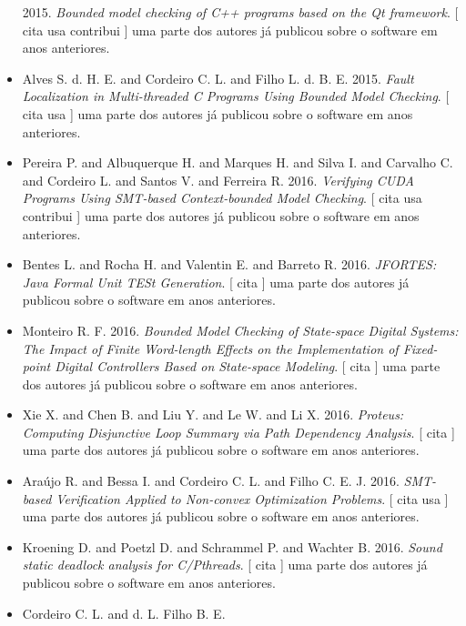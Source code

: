 \begin{itemize}
      2015.
        \textit{ Bounded model checking of C++ programs based on the Qt framework}.
      [
          cita
          usa
          contribui
      ]
uma parte dos autores já publicou sobre o software em anos anteriores.
\item Alves S. d. H. E. and Cordeiro C. L. and Filho L. d. B. E.
      2015.
        \textit{ Fault Localization in Multi-threaded C Programs Using Bounded Model Checking}.
      [
          cita
          usa
      ]
uma parte dos autores já publicou sobre o software em anos anteriores.
\item Pereira P. and Albuquerque H. and Marques H. and Silva I. and Carvalho C. and Cordeiro L. and Santos V. and Ferreira R.
      2016.
        \textit{ Verifying CUDA Programs Using SMT-based Context-bounded Model Checking}.
      [
          cita
          usa
          contribui
      ]
uma parte dos autores já publicou sobre o software em anos anteriores.
\item Bentes L. and Rocha H. and Valentin E. and Barreto R.
      2016.
        \textit{ JFORTES: Java Formal Unit TESt Generation}.
      [
          cita
      ]
uma parte dos autores já publicou sobre o software em anos anteriores.
\item Monteiro R. F.
      2016.
        \textit{ Bounded Model Checking of State-space Digital Systems: The Impact of Finite Word-length Effects on the Implementation of Fixed-point Digital Controllers Based on State-space Modeling}.
      [
          cita
      ]
uma parte dos autores já publicou sobre o software em anos anteriores.
\item Xie X. and Chen B. and Liu Y. and Le W. and Li X.
      2016.
        \textit{ Proteus: Computing Disjunctive Loop Summary via Path Dependency Analysis}.
      [
          cita
      ]
uma parte dos autores já publicou sobre o software em anos anteriores.
\item Araújo R. and Bessa I. and Cordeiro C. L. and Filho C. E. J.
      2016.
        \textit{ SMT-based Verification Applied to Non-convex Optimization Problems}.
      [
          cita
          usa
      ]
uma parte dos autores já publicou sobre o software em anos anteriores.
\item Kroening D. and Poetzl D. and Schrammel P. and Wachter B.
      2016.
        \textit{ Sound static deadlock analysis for C/Pthreads}.
      [
          cita
      ]
uma parte dos autores já publicou sobre o software em anos anteriores.
\item Cordeiro C. L. and d. L. Filho B. E.

\end{itemize}
